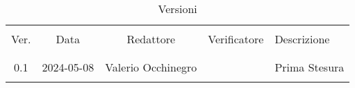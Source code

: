 \documentclass[italian,12pt]{article}
\begin{document}

\newpage


\begin{table}[!h]
	\caption*{Versioni}
	\begin{center}
		\begin{tabular}{ c c c c p{6.1cm} }
			\hline                                                                                                 \\[-2ex]
			Ver. & Data       & Redattore          & Verificatore      & Descrizione                                    \\
			\\[-2ex] \hline \\[-1.5ex]
			0.1  & 2024-05-08 & Valerio Occhinegro &                   & Prima Stesura \\
			\\[-1.5ex] \hline
		\end{tabular}
	\end{center}
\end{table}

\newpage
\tableofcontents
\listoftables
\listoffigures
\newpage












\end{document}

